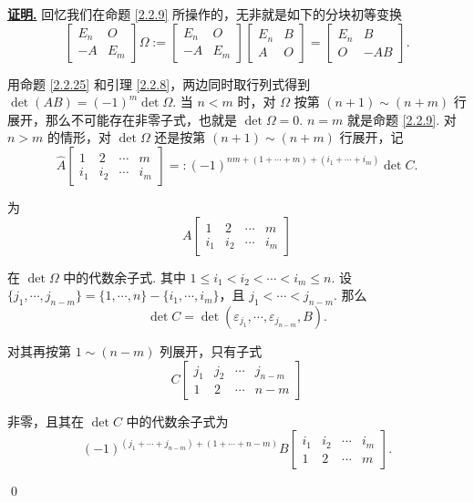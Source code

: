 \documentclass[10pt,openany]{article}
\theoremstyle{thmstyle} %
\theoremstyle{defstyle} %
\theoremstyle{prostyle} %
\theoremstyle{exastyle}
\theoremstyle{remstyle}
\renewenvironment{proof}[1][证明]{\par\underline{\textbf{#1.}} \;\fangsong}{\qed\par}
\begin{document}
\begin{proof}
	回忆我们在命题 \ref{2.2.9} 所操作的，无非就是如下的分块初等变换
	\[ \begin{bmatrix}
		E_n & O \\
		-A & E_m
	\end{bmatrix} \Omega:=\begin{bmatrix}
	E_n & O \\
	-A & E_m
	\end{bmatrix}\begin{bmatrix}
		E_n & B \\
		A & O
	\end{bmatrix}=\begin{bmatrix}
	E_n & B \\
	O & -AB 
	\end{bmatrix}.
	\]
	
	用命题 \ref{2.2.25} 和引理 \ref{2.2.8}，两边同时取行列式得到 \( \det(AB)=(-1)^m \det \Omega \). 当 \( n<m \) 时，对 \( \Omega \) 按第 \( (n+1) \sim (n+m) \) 行展开，那么不可能存在非零子式，也就是 \( \det \Omega=0 \). \( n=m \) 就是命题 \ref{2.2.9}. 对 \( n>m \) 的情形，对 \( \det \Omega \) 还是按第 \( (n+1) \sim (n+m) \) 行展开，记
	\[ \hat{A}\begin{bmatrix}
		1 & 2 & \cdots & m \\
		i_1 & i_2 & \cdots & i_m
	\end{bmatrix}=:(-1)^{nm+(1+\cdots+m)+(i_1+\cdots+i_m)} \det C. \]
	
	为
	\[ A\begin{bmatrix}
		1 & 2 & \cdots & m \\
		i_1 & i_2 & \cdots & i_m
	\end{bmatrix} \]
	
	在 \( \det \Omega \) 中的代数余子式. 其中 \( 1 \leq i_1 < i_2 < \cdots < i_m \leq n \). 设 \( \{j_1,\cdots,j_{n-m} \}=\{1,\cdots,n\}-\{i_1,\cdots,i_m\} \)，且 \( j_1<\cdots<j_{n-m} \). 那么
	\[ \det C= \det (\varepsilon_{j_1},\cdots,\varepsilon_{j_{n-m}},B). \]
	
	对其再按第 \( 1 \sim (n-m) \) 列展开，只有子式 
	\[ C\begin{bmatrix}
		j_1 & j_2 & \cdots & j_{n-m} \\
		1 & 2 & \cdots & {n-m}
	\end{bmatrix} \]
	
	非零，且其在 \( \det C \) 中的代数余子式为
	\[ (-1)^{(j_1+\cdots+j_{n-m})+(1+\cdots+n-m)}B\begin{bmatrix}
		i_1 & i_2 & \cdots & i_m \\
		1 & 2 & \cdots & m
	\end{bmatrix}. \]
	

\end{proof}
\end{document}

